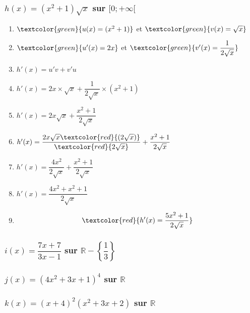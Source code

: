 \documentclass[t]{beamer}
\begin{document}
\begin{frame}
\frametitle{$h(x) = (x^2+1)\sqrt{x} $ sur $[0;+\infty[$}
\pause
\begin{enumerate}[]
\item $\textcolor{green}{u(x) = (x^2+1)}$ et $\textcolor{green}{v(x) = \sqrt{x}} $ 
\pause
\item $\textcolor{green}{u'(x) = 2x}$ et $\textcolor{green}{v'(x) = \dfrac{1}{2\sqrt{x}}} $ 
\pause
\item \(h'(x) = u'v + v'u \)
\pause
\item \(h'(x) = 2x \times \sqrt{x} +  \dfrac{1}{2\sqrt{x}} \times (x^2+1) \)
\pause
\item \(h'(x) = 2x\sqrt{x} +  \dfrac{x^2+1}{2\sqrt{x}}\)
\pause
\item \(h'(x) = \dfrac{2x\sqrt{x}\textcolor{red}{(2\sqrt{x})}}{\textcolor{red}{2\sqrt{x}}} +  \dfrac{x^2+1}{2\sqrt{x}}\)
\pause
\item \(h'(x) = \dfrac{4x^2}{2\sqrt{x}} +  \dfrac{x^2+1}{2\sqrt{x}}\)
\pause
\item \(h'(x) = \dfrac{4x^2 + x^2+1}{2\sqrt{x}}\)
\pause
\item \[\textcolor{red}{h'(x) = \dfrac{5x^2+1}{2\sqrt{x}}}\]
\end{enumerate}
\end{frame}

\begin{frame}
\frametitle{$i(x) = \dfrac{7x+7}{3x-1} $ sur $\mathbb{R} - \left\lbrace  \dfrac{1}{3} \right\rbrace $}
\end{frame}

\begin{frame}
\frametitle{$j(x) = (4x^2+3x+1)^4$ sur $\mathbb{R}$}
\end{frame}

\begin{frame}
\frametitle{ $k(x) = (x+4)^2 (x^2+3x+2) $ sur $\mathbb{R}$}
\end{frame}
\end{document}

